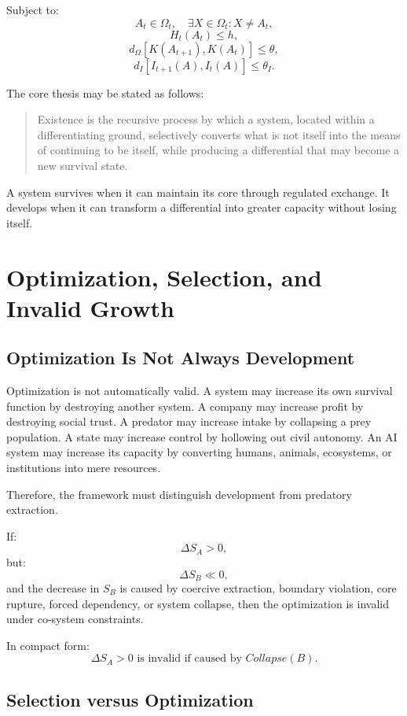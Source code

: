 \documentclass[11pt,a4paper]{article}
\begin{document}
Subject to:
\[
A_t\in\Omega_t,
\quad
\exists X\in\Omega_t:X\neq A_t,
\]
\[
H_t(A_t)\leq h,
\]
\[
d_{\Omega}[K(A_{t+1}),K(A_t)]\leq\theta,
\]
\[
d_I[I_{t+1}(A),I_t(A)]\leq\theta_I.
\]

The core thesis may be stated as follows:

\begin{quote}
Existence is the recursive process by which a system, located within a differentiating ground, selectively converts what is not itself into the means of continuing to be itself, while producing a differential that may become a new survival state.
\end{quote}

A system survives when it can maintain its core through regulated exchange. It develops when it can transform a differential into greater capacity without losing itself.

\section{Optimization, Selection, and Invalid Growth}

\subsection{Optimization Is Not Always Development}

Optimization is not automatically valid. A system may increase its own survival function by destroying another system. A company may increase profit by destroying social trust. A predator may increase intake by collapsing a prey population. A state may increase control by hollowing out civil autonomy. An AI system may increase its capacity by converting humans, animals, ecosystems, or institutions into mere resources.

Therefore, the framework must distinguish development from predatory extraction.

If:
\[
\Delta S_A>0,
\]
but:
\[
\Delta S_B\ll0,
\]
and the decrease in $S_B$ is caused by coercive extraction, boundary violation, core rupture, forced dependency, or system collapse, then the optimization is invalid under co-system constraints.

In compact form:
\[
\Delta S_A>0
\text{ is invalid if caused by }
Collapse(B).
\]

\subsection{Selection versus Optimization}
\end{document}
